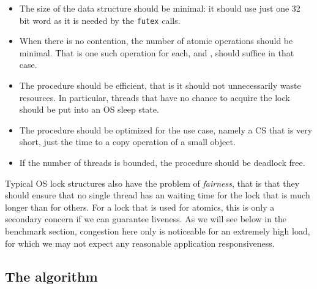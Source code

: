 \begin{itemize}
\item The size of the data structure should be minimal: it should
use just one 32 bit word as it is needed by the \texttt{futex}
calls.\itemadjust

\item When there is no contention, the number of atomic operations should
be minimal. That is one such operation for each,  and
, should suffice in that case.\itemadjust

\item The procedure should be efficient, that is it should not
unnecessarily waste resources. In particular, threads that have no
chance to acquire the lock should be put into an OS sleep
state.\itemadjust

\item The procedure should be optimized for the use case, namely a CS that
  is very short, just the time to a copy operation of a small object.

\item If the number of threads is bounded, the procedure should be
deadlock free.\itemadjust
\end{itemize}

Typical OS lock structures also have the problem of \emph{fairness}, that
is that they should ensure that no single thread has an waiting time for
the lock that is much longer than for others. For a lock that is used for
atomics, this is only a secondary concern if we can guarantee liveness. As
we will see below in the benchmark section, congestion here only is
noticeable for an extremely high load, for which we may not expect any
reasonable application responsiveness.

\subsection{The algorithm}
\label{sec-3-1}
\fi


